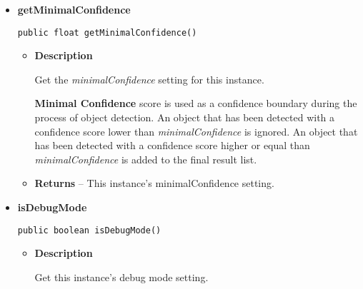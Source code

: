 {{{{\begin{itemize}
{\begin{itemize}
{}%
\item{{\bf  Throws}
}%
\end{itemize}
}%
\item{ 
{\bf  getMinimalConfidence}\\
\begin{lstlisting}[frame=none]
public float getMinimalConfidence()\end{lstlisting} %
\begin{itemize}
\item{
{\bf  Description}



Get the \textit{ minimalConfidence} setting for this instance.

{\bf Minimal Confidence} score is used as a confidence boundary during the process of object detection. An object that has been detected with a confidence score lower than \textit{ minimalConfidence} is ignored. An object that has been detected with a confidence score higher or equal than \textit{ minimalConfidence} is added to the final result list.
}
\item{{\bf  Returns} -- 
This instance's minimalConfidence setting. 
}%
\end{itemize}
}%
\item{ 
{\bf  isDebugMode}\\
\begin{lstlisting}[frame=none]
public boolean isDebugMode()\end{lstlisting} %
\begin{itemize}
\item{
{\bf  Description}



Get this instance's debug mode setting.

}
\end{itemize}}
\end{itemize}}}}}
